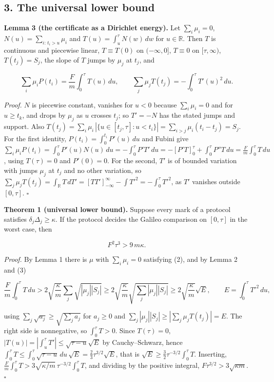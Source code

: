 \documentclass[11pt,a4paper]{article}
\begin{document}
\hypertarget{the-universal-lower-bound}{%
\subsection{3. The universal lower
bound}\label{the-universal-lower-bound}}

\textbf{Lemma 3 (the certificate as a Dirichlet energy).} Let
\(\sum_i\mu_i=0\), \(N(u)=\sum_{i:\,t_i>u}\mu_i\) and
\(T(u)=\int_u^\tau N(w)\,dw\) for \(u\in\mathbb R\). Then \(T\) is
continuous and piecewise linear, \(T\equiv T(0)\) on \((-\infty,0]\),
\(T\equiv0\) on \([\tau,\infty)\), \(T(t_j)=S_j\), the slope of \(T\)
jumps by \(\mu_j\) at \(t_j\), and

\[\sum_i\mu_iP(t_i)=\frac Fm\int_0^\tau T(u)\,du,\qquad
\sum_j\mu_jT(t_j)=-\int_0^\tau T'(u)^2\,du. \tag{3}\]

\emph{Proof.} \(N\) is piecewise constant, vanishes for \(u<0\) because
\(\sum_i\mu_i=0\) and for \(u\ge t_k\), and drops by \(\mu_j\) as \(u\)
crosses \(t_j\); so \(T'=-N\) has the stated jumps and support. Also
\(T(t_j)=\sum_i\mu_i\,|\{u\in[t_j,\tau]:u<t_i\}|=\sum_{i>j}\mu_i(t_i-t_j)=S_j\).
For the first identity, \(P(t_i)=\int_0^{t_i}P'(u)\,du\) and Fubini give
\(\sum_i\mu_iP(t_i)=\int_0^\tau P'(u)N(u)\,du=-\int_0^\tau P'T'\,du =-[P'T]_0^\tau+\int_0^\tau P''T\,du=\frac Fm\int_0^\tau T\,du\),
using \(T(\tau)=0\) and \(P'(0)=0\). For the second, \(T'\) is of
bounded variation with jumps \(\mu_j\) at \(t_j\) and no other
variation, so
\(\sum_j\mu_jT(t_j)=\int_{\mathbb R}T\,dT'=[TT']_{-\infty}^{\infty}-\int T'^2 =-\int_0^\tau T'^2\),
as \(T'\) vanishes outside \([0,\tau]\). \(\square\)

\textbf{Theorem 1 (universal lower bound).} Suppose every mark of a
protocol satisfies \(\delta_j\Delta_j\ge\kappa\). If the protocol
decides the Galileo comparison on \([0,\tau]\) in the worst case, then

\[F^2\tau^3>9\,m\kappa .\]

\emph{Proof.} By Lemma 1 there is \(\mu\) with \(\sum_i\mu_i=0\)
satisfying (2), and by Lemma 2 and (3)

\[\frac Fm\int_0^\tau T\,du>2\sqrt{\frac\kappa m}\sum_j\sqrt{|\mu_j||S_j|}
\ge2\sqrt{\frac\kappa m}\sqrt{\sum_j|\mu_j||S_j|}
\ge2\sqrt{\frac\kappa m}\sqrt{E},\qquad E=\int_0^\tau T'^2\,du,\]

using \(\sum_j\sqrt{a_j}\ge\sqrt{\sum_ja_j}\) for \(a_j\ge0\) and
\(\sum_j|\mu_j||S_j|\ge|\sum_j\mu_jT(t_j)|=E\). The right side is
nonnegative, so \(\int_0^\tau T>0\). Since \(T(\tau)=0\),
\(|T(u)|=|\int_u^\tau T'|\le\sqrt{\tau-u}\sqrt E\) by Cauchy--Schwarz,
hence
\(\int_0^\tau T\le\int_0^\tau\sqrt{\tau-u}\,du\,\sqrt E=\tfrac23\tau^{3/2}\sqrt E\),
that is \(\sqrt E\ge\tfrac32\tau^{-3/2}\int_0^\tau T\). Inserting,
\(\frac Fm\int_0^\tau T>3\sqrt{\kappa/m}\,\tau^{-3/2}\int_0^\tau T\),
and dividing by the positive integral, \(F\tau^{3/2}>3\sqrt{\kappa m}\).
\(\square\)
\end{document}
